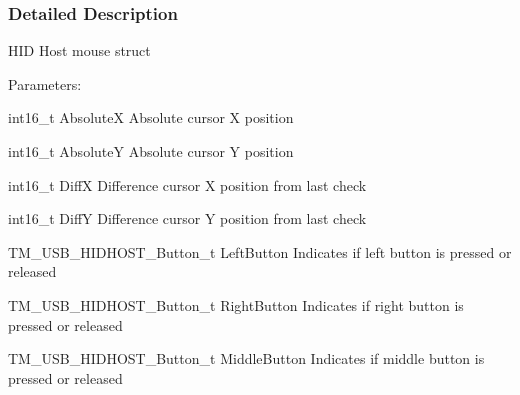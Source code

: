 \subsubsection{Detailed Description}
H\+I\+D Host mouse struct

Parameters\+:
\begin{DoxyItemize}
\item int16\+\_\+t Absolute\+X Absolute cursor X position
\item int16\+\_\+t Absolute\+Y Absolute cursor Y position
\item int16\+\_\+t Diff\+X Difference cursor X position from last check
\item int16\+\_\+t Diff\+Y Difference cursor Y position from last check
\item T\+M\+\_\+\+U\+S\+B\+\_\+\+H\+I\+D\+H\+O\+S\+T\+\_\+\+Button\+\_\+t Left\+Button Indicates if left button is pressed or released
\item T\+M\+\_\+\+U\+S\+B\+\_\+\+H\+I\+D\+H\+O\+S\+T\+\_\+\+Button\+\_\+t Right\+Button Indicates if right button is pressed or released
\item T\+M\+\_\+\+U\+S\+B\+\_\+\+H\+I\+D\+H\+O\+S\+T\+\_\+\+Button\+\_\+t Middle\+Button Indicates if middle button is pressed or released 
\end{DoxyItemize}